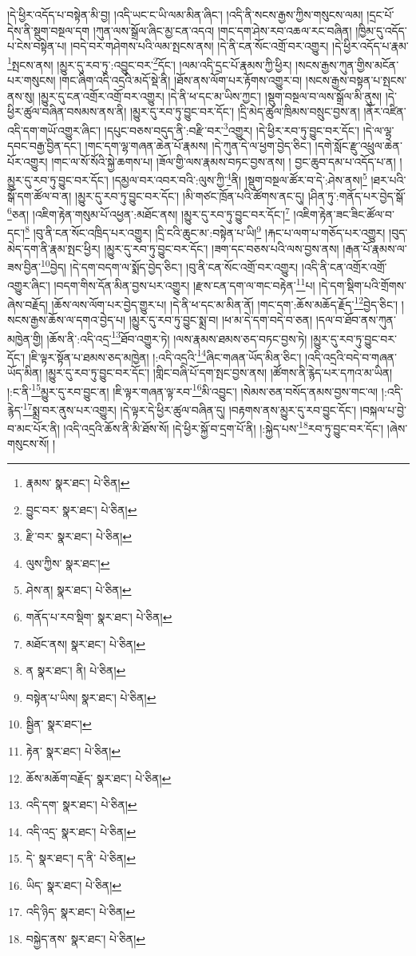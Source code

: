 །དེ་ཕྱིར་འདོད་པ་བསྟེན་མི་བྱ། །འདི་ཡང་ང་ཡི་ལམ་མིན་ཞིང་། །འདི་ནི་སངས་རྒྱས་ཀྱིས་གསུངས་ལམ། །དྲང་པོ་དེས་ནི་སྡུག་བསྔལ་དག །ཀུན་ལས་སྒྲོལ་ཞིང་མྱ་ངན་འདའ། །གང་དག་ཤེས་རབ་འཆལ་རང་བཞིན། །ཁྱིམ་དུ་འདོད་པ་ངེས་བསྟེན་པ། །བདེ་བར་གཤེགས་པའི་ལམ་སྤངས་ནས། །དེ་ནི་ངན་སོང་འགྲོ་བར་འགྱུར། །དེ་ཕྱིར་འདོད་པ་རྣམ་\footnote{རྣམས་  སྣར་ཐང་།  པེ་ཅིན། }སྤངས་ནས། །མྱུར་དུ་རབ་ཏུ་:འབྱུང་བར་\footnote{བྱུང་བར་  སྣར་ཐང་།  པེ་ཅིན། }དོང་། །ལམ་འདི་དྲང་པོ་རྣམས་ཀྱི་ཕྱིར། །སངས་རྒྱས་ཀུན་གྱིས་མངོན་པར་གསུངས། །གང་ཞིག་འདི་འདྲའི་མདོ་སྡེ་ནི། །ཐོས་ནས་ལོག་པར་རྟོགས་འགྱུར་བ། །སངས་རྒྱས་བསྟན་པ་སྤངས་ནས་སུ། །མྱུར་དུ་ངན་འགྲོར་འགྲོ་བར་འགྱུར། །དེ་ནི་ཕ་དང་མ་ཡིས་ཀྱང་། །སྡུག་བསྔལ་བ་ལས་སྒྲོལ་མི་ནུས། །དེ་ཕྱིར་ཚུལ་བཞིན་བསམས་ནས་ནི། །མྱུར་དུ་རབ་ཏུ་བྱུང་བར་དོང་། །དྲི་མེད་ཚུལ་ཁྲིམས་བསྲུང་བྱས་ན། །ནོར་འཛིན་འདི་དག་གཡོ་འགྱུར་ཞིང་། །དཔུང་བཅས་བདུད་ནི་:བརྫི་བར་\footnote{རྫི་བར་  སྣར་ཐང་།  པེ་ཅིན། }འགྱུར། །དེ་ཕྱིར་རབ་ཏུ་བྱུང་བར་དོང་། །དེ་ལ་ལྷ་དབང་བརྒྱ་བྱིན་དང་། །གང་དག་ལྷ་གཞན་ཆེན་པོ་རྣམས། །དེ་ཀུན་དེ་ལ་ཕྱག་བྱེད་ཅིང་། །དགེ་སློང་རྫུ་འཕྲུལ་ཆེན་པོར་འགྱུར། །གང་ལ་སོ་སོའི་སྐྱེ་ཆགས་པ། །ཟོལ་གྱི་ལས་རྣམས་བཏང་བྱས་ནས། །
བྱང་ཆུབ་དམ་པ་འདོད་པ་ན། །མྱུར་དུ་རབ་ཏུ་བྱུང་བར་དོང་། །དམྱལ་བར་འབར་བའི་:ལུས་ཀྱི་\footnote{ལུས་ཀྱིས་  སྣར་ཐང་། }ནི། །སྡུག་བསྔལ་ཚོར་བ་དེ་:ཤེས་ནས།\footnote{ཤེས་ན།  སྣར་ཐང་།  པེ་ཅིན། } །ཐར་པའི་སྒོ་དག་ཚོལ་བ་ན། །མྱུར་དུ་རབ་ཏུ་བྱུང་བར་དོང་། །མི་གཙང་ཁྲོན་པའི་ཚོགས་ནང་དུ། །ཤིན་ཏུ་:གནོད་པར་བྱེད་སྒོ་\footnote{གནོད་པ་རབ་སྡིག་  སྣར་ཐང་།  པེ་ཅིན། }ཅན། །འཇིག་རྟེན་གསུམ་པོ་འཕྱན་:མཐོང་ནས། །མྱུར་དུ་རབ་ཏུ་བྱུང་བར་དོང་།\footnote{མཐོང་ནས།  སྣར་ཐང་།  པེ་ཅིན། } །འཇིག་རྟེན་ཟང་ཟིང་ཚོལ་བ་དང་།\footnote{ན  སྣར་ཐང་། ནི།  པེ་ཅིན། } །བུ་ནི་ངན་སོང་འཁྲིད་པར་འགྱུར། །དྲི་ངའི་ཆུང་མ་:བསྟེན་པ་ཡི།\footnote{བསྟེན་པ་ཡིས།  སྣར་ཐང་།  པེ་ཅིན། } །རྐང་པ་ལག་པ་གཅོད་པར་འགྱུར། །བུད་མེད་དག་ནི་རྣམ་སྤང་ཕྱིར། །མྱུར་དུ་རབ་ཏུ་བྱུང་བར་དོང་། །ཟག་དང་བཅས་པའི་ལས་བྱས་ནས། །རྒན་པོ་རྣམས་ལ་ཟས་བྱིན་\footnote{སྦྱིན་  སྣར་ཐང་། }བྱེད། །དེ་དག་བདག་ལ་སྨོད་བྱེད་ཅིང་། །བུ་ནི་ངན་སོང་འགྲོ་བར་འགྱུར། །འདི་ནི་ངན་འགྲོར་འགྲོ་འགྱུར་ཞིང་། །བདག་གིས་དོན་མིན་བྱས་པར་འགྱུར། །རྫས་ངན་དག་ལ་གང་བརྟེན་\footnote{རྟེན་  སྣར་ཐང་།  པེ་ཅིན། }པ། །དེ་དག་སྡིག་པའི་གྲོགས་ཞེས་བརྗོད། །ཆོས་ལས་ལོག་པར་བྱེད་གྱུར་པ། །དེ་ནི་ཕ་དང་མ་མིན་ནོ། །གང་དག་:ཆོས་མཆོད་རྗོད་\footnote{ཆོས་མཆོག་བརྗོད་  སྣར་ཐང་།  པེ་ཅིན། }བྱེད་ཅིང་། །སངས་རྒྱས་ཆོས་ལ་དགའ་བྱེད་པ། །མྱུར་དུ་རབ་ཏུ་བྱུང་སྨྲ་བ། །ཕ་མ་དེ་དག་བདེ་བ་ཅན། །དལ་བ་ཐོབ་ནས་ཀུན་མཁྱེན་གྱི། །ཆོས་ནི་:འདི་འདྲ་\footnote{འདི་དག་  སྣར་ཐང་།  པེ་ཅིན། }ཐོབ་འགྱུར་ཏེ། །ལས་རྣམས་ཐམས་ཅད་བཏང་བྱས་ཏེ། །མྱུར་དུ་རབ་ཏུ་བྱུང་བར་དོང་། །ཇི་ལྟར་སྟོན་པ་ཐམས་ཅད་མཁྱེན། །:འདི་འདྲའི་\footnote{འདི་འདྲ་  སྣར་ཐང་།  པེ་ཅིན། }ཞིང་གཞན་ཡོད་མིན་ཅིང་། །འདི་འདྲའི་བདེ་བ་གཞན་ཡོད་མིན། །མྱུར་དུ་རབ་ཏུ་བྱུང་བར་དོང་། །གླིང་བཞི་པོ་དག་སྤང་བྱས་ནས། །ཚོགས་ནི་རྙེད་པར་དཀའ་མ་ཡིན། །:ང་ནི་\footnote{དེ་  སྣར་ཐང་། ད་ནི་  པེ་ཅིན། }མྱུར་དུ་རབ་བྱུང་ན། །ཇི་ལྟར་གཞན་ལྟ་རབ་\footnote{ཡིད་  སྣར་ཐང་།  པེ་ཅིན། }མི་འབྱུང་། །སེམས་ཅན་བསོད་ནམས་བྱས་གང་ལ། །:འདི་རྙེད་\footnote{འདི་ཉིད་  སྣར་ཐང་།  པེ་ཅིན། }སྨྲ་བར་ནུས་པར་འགྱུར། །དེ་ལྟར་དེ་ཕྱིར་ཚུལ་བཞིན་དུ། །བརྟགས་ནས་མྱུར་དུ་རབ་བྱུང་དོང་། །བསྐལ་པ་བྱེ་བ་མང་པོར་ནི། །འདི་འདྲའི་ཆོས་ནི་མི་ཐོས་སོ། །དེ་ཕྱིར་སྐྱོ་བ་དྲག་པོ་ནི། །:སྐྱེད་པས་\footnote{བསྐྱེད་ནས་  སྣར་ཐང་།  པེ་ཅིན། }རབ་ཏུ་བྱུང་བར་དོང་། །ཞེས་གསུངས་སོ། །
